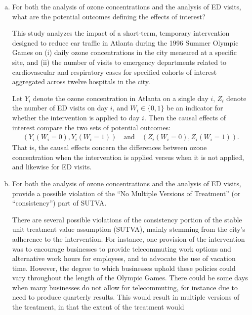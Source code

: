 \begin{enumerate}[(a)]
\item
  \begin{quoting}
    For both the analysis of ozone concentrations and the analysis of
    ED visits, what are the potential outcomes defining the effects of
    interest?
  \end{quoting}
  This study analyzes the impact of a short-term, temporary
  intervention designed to reduce car traffic in Atlanta during the
  1996 Summer Olympic Games on (i) daily ozone concentrations in the
  city measured at a specific site, and (ii) the number of visits to
  emergency departments related to cardiovascular and respiratory
  cases for specified cohorts of interest aggregated across twelve
  hospitals in the city.

  Let $Y_i$ denote the ozone concentration in Atlanta on a single day
  $i$, $Z_i$ denote the number of ED visits on day $i$, and
  $W_i \in \{0, 1\}$ be an indicator for whether the intervention is
  applied to day $i$.  Then the causal effects of interest compare the
  two sets of potential outcomes:
  \begin{align*}
    (Y_i(W_i = 0), Y_i(W_i = 1))
    \quad
    \text{and}\quad (Z_i(W_i = 0), Z_i(W_i = 1)).
  \end{align*}
    That is, the causal effects concern the differences between ozone
  concentration when the intervention is applied versus when it is not
  applied, and likewise for ED visits.
\item
  \begin{quoting}
    For both the analysis of ozone concentrations and the analysis of
    ED visits, provide a possible violation of the ``No Multiple
    Versions of Treatment'' (or ``consistency'') part of SUTVA.
  \end{quoting}
  There are several possible violations of the consistency portion of
  the stable unit treatment value assumption (SUTVA), mainly stemming
  from the city's adherence to the intervention.  For instance, one
  provision of the intervention was to encourage businesses to provide
  telecommuting work options and alternative work hours for employees,
  and to advocate the use of vacation time.  However, the degree to
  which businesses uphold these policies could vary throughout the
  length of the Olympic Games.  There could be some days when many
  businesses do not allow for telecommuting, for instance due to need
  to produce quarterly results.  This would result in multiple
  versions of the treatment, in that the extent of the treatment would

\end{enumerate}
